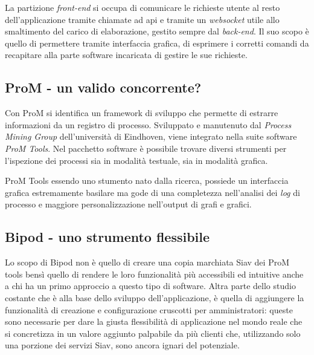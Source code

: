La partizione \textit{front-end} si occupa di comunicare le richieste utente al resto dell'applicazione tramite chiamate ad \acrshort{api} e tramite un \textit{websocket} utile allo smaltimento del carico di elaborazione, gestito sempre dal \textit{back-end}. Il suo scopo è quello di permettere tramite interfaccia grafica, di esprimere i corretti comandi da recapitare alla parte software incaricata di gestire le sue richieste.

\subsection{ProM - un valido concorrente?}
Con ProM si identifica un framework di sviluppo che permette di estrarre informazioni da un registro di processo. Sviluppato e manutenuto dal \textit{Process Mining Group} dell'università di Eindhoven, viene integrato nella suite software \textit{ProM Tools}. Nel pacchetto software è possibile trovare diversi strumenti per l'ispezione dei processi sia in modalità testuale, sia in modalità grafica.

ProM Tools essendo uno stumento nato dalla ricerca, possiede un interfaccia grafica estremamente basilare ma gode di una completezza nell'analisi dei \textit{log} di processo e maggiore personalizzazione nell'output di grafi e grafici.
\subsection{Bipod - uno strumento flessibile}
Lo scopo di Bipod non è quello di creare una copia marchiata Siav dei ProM tools bensì quello di rendere le loro funzionalità più accessibili ed intuitive anche a chi ha un primo approccio a questo tipo di software.
Altra parte dello studio costante che è alla base dello sviluppo dell'applicazione, è quella di aggiungere la funzionalità di creazione e configurazione cruscotti per amministratori: queste sono necessarie per dare la giusta flessibilità di applicazione nel mondo reale che si concretizza in un valore aggiunto palpabile da più clienti che, utilizzando solo una porzione dei servizi Siav, sono ancora ignari del potenziale.

